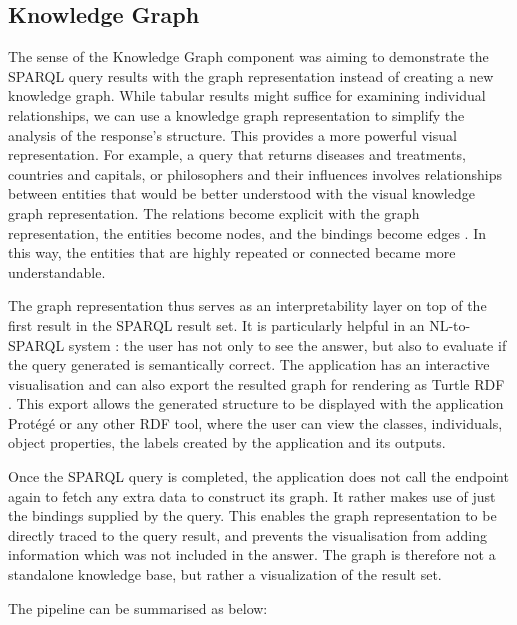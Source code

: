 \documentclass[11pt,a4paper]{article}
\begin{document}
\subsection{Knowledge Graph}
\label{sec:kgviz}

The sense of the Knowledge Graph component was aiming to demonstrate the SPARQL query results with the graph representation \cite{hogan2021kg} instead of creating a new knowledge graph. While tabular results might suffice for examining individual relationships, we can use a knowledge graph representation to simplify the analysis of the response's structure. This provides a more powerful visual representation. For example, a query that returns diseases and treatments, countries and capitals, or philosophers and their influences involves relationships between entities that would be better understood with the visual knowledge graph representation. The relations become explicit with the graph representation, the entities become nodes, and the bindings become edges \cite{hogan2021kg}. In this way, the entities that are highly repeated or connected became more understandable.

The graph representation thus serves as an interpretability layer on top of the first result in the SPARQL result set. It is particularly helpful in an NL-to-SPARQL system \cite{hoffner2017survey,diefenbach2018core}: the user has not only to see the answer, but also to evaluate if the query generated is semantically correct. The application has an interactive visualisation and can also export the resulted graph for rendering as Turtle RDF \cite{rdflib}. This export allows the generated structure to be displayed with the application Prot\'eg\'e \cite{musen2015protege} or any other RDF tool, where the user can view the classes, individuals, object properties, the labels created by the application and its outputs.

Once the SPARQL query is completed, the application does not call the endpoint again to fetch any extra data to construct its graph. It rather makes use of just the bindings supplied by the query. This enables the graph representation to be directly traced to the query result, and prevents the visualisation from adding information which was not included in the answer. The graph is therefore not a standalone knowledge base, but rather a visualization of the result set.

The pipeline can be summarised as below:
\end{document}
